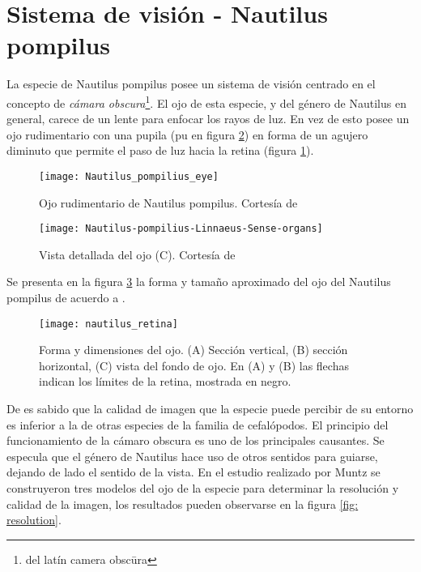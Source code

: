 \documentclass[a4paper,12pt]{article}
\begin{document}
\section{Sistema de visión - Nautilus pompilus}

La especie de Nautilus pompilus posee un sistema de visión centrado en el concepto de \emph{cámara obscura}\footnote{del latín camera obscūra}.
El ojo de esta especie, y del género de Nautilus en general, carece de un lente \cite{sasaki2010Anatomy} para enfocar los rayos de luz.
En vez de esto posee un ojo rudimentario con una pupila (pu en figura \ref{fig: electron microscope}) en forma de un agujero diminuto que permite el paso de luz hacia la retina (figura \ref{fig: pinhole eye}).


\begin{figure}[hbt!]
 \centering
 \texttt{[image: Nautilus\_pompilius\_eye]}
 \caption{Ojo rudimentario de Nautilus pompilus. Cortesía de \cite{hillewaert2008Nautilus}}
 \label{fig: pinhole eye}
\end{figure}

\begin{figure}[hbt!]
 \centering
 \texttt{[image: Nautilus-pompilius-Linnaeus-Sense-organs]}
 \caption{Vista detallada del ojo (C). Cortesía de \cite{sasaki2010Anatomy}}
 \label{fig: electron microscope}
\end{figure}


Se presenta en la figura \ref{fig: retina} la forma y tamaño aproximado del ojo del Nautilus pompilus de acuerdo a \cite{muntz1984VisualSystem}.

\begin{figure}[hbt!]
 \centering
 \texttt{[image: nautilus\_retina]}
 \caption{Forma y dimensiones del ojo. (A) Sección vertical, (B) sección horizontal, (C) vista del fondo de ojo. En (A) y (B) las flechas indican los límites de la retina, mostrada en negro. \cite{muntz1984VisualSystem}}
 \label{fig: retina}
\end{figure}



De \cite{muntz1984VisualSystem} es sabido que la calidad de imagen que la especie puede percibir de su entorno es inferior a la de otras especies de la familia de cefalópodos.
El principio del funcionamiento de la cámaro obscura es uno de los principales causantes.
Se especula que el género de Nautilus hace uso de otros sentidos para guiarse, dejando de lado el sentido de la vista.
En el estudio realizado por Muntz se construyeron tres modelos del ojo de la especie para determinar la resolución y calidad de la imagen, los resultados pueden observarse en la figura \ref{fig: resolution}.
\end{document}
